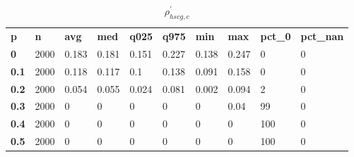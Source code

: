 \begin{table}[h]
 \centering 
\footnotesize
\caption{$\rho_{hscg,c}^\prime $}
\label{tab:alphahscgc}
\begin{tabular}[h]{| l l l l l l l l l l|
    } \hline
\textbf{ p} & \textbf{ n} & \textbf{ avg} & \textbf{ med} & \textbf{ q025} & \textbf{ q975} & \textbf{ min} & \textbf{ max} & \textbf{ pct\_0} & \textbf{ pct\_nan}
           \\
  \textbf{  0} & 2000 & 0.183 & 0.181 & 0.151 & 0.227 & 0.138 & 0.247 &   0 & 0
           \\
  \textbf{0.1} & 2000 & 0.118 & 0.117 &   0.1 & 0.138 & 0.091 & 0.158 &   0 & 0
           \\
  \textbf{0.2} & 2000 & 0.054 & 0.055 & 0.024 & 0.081 & 0.002 & 0.094 &   2 & 0
           \\
  \textbf{0.3} & 2000 &     0 &     0 &     0 &     0 &     0 &  0.04 &  99 & 0
           \\
  \textbf{0.4} & 2000 &     0 &     0 &     0 &     0 &     0 &     0 & 100 & 0
           \\
  \textbf{0.5} & 2000 &     0 &     0 &     0 &     0 &     0 &     0 & 100 & 0
           \\
 \hline \end{tabular}
 \end{table}
